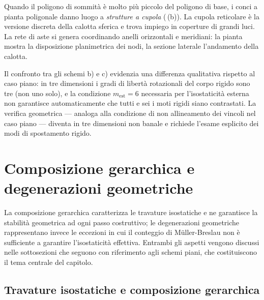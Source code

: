 Quando il poligono di sommità è molto più piccolo
del poligono di base, i conci a pianta poligonale
danno luogo a \emph{strutture a cupola}
(\,(b)). La cupola
reticolare è la versione discreta della calotta
sferica e trova impiego in coperture di grandi
luci. La rete di aste si genera coordinando anelli
orizzontali e meridiani: la pianta mostra la
disposizione planimetrica dei nodi, la sezione
laterale l'andamento della calotta.



\begin{oss}
	Il confronto tra gli schemi b) e c) evidenzia
	una differenza qualitativa rispetto al caso
	piano: in tre dimensioni i gradi di libertà
	rotazionali del corpo rigido sono tre
	(non uno solo), e la condizione $m_{\text{est}} = 6$
	necessaria per l'isostaticità esterna non
	garantisce automaticamente che tutti e sei i
	moti rigidi siano contrastati. La verifica
	geometrica --- analoga alla condizione di
	non allineamento dei vincoli nel caso piano ---
	diventa in tre dimensioni non banale e
	richiede l'esame esplicito dei modi di
	spostamento rigido.
\end{oss}



\section{Composizione gerarchica e degenerazioni geometriche}
\label{sec:composizione_degenerazioni}

La composizione gerarchica caratterizza le travature
isostatiche e ne garantisce la stabilità geometrica
ad ogni passo costruttivo; le degenerazioni
geometriche rappresentano invece le eccezioni in
cui il conteggio di M\"{u}ller-Breslau non è sufficiente
a garantire l'isostaticità effettiva. Entrambi gli
aspetti vengono discussi nelle sottosezioni che
seguono con riferimento agli schemi piani, che
costituiscono il tema centrale del capitolo.

\subsection{Travature isostatiche e composizione
	gerarchica}
\label{subsec:reticolari_isostatiche}


